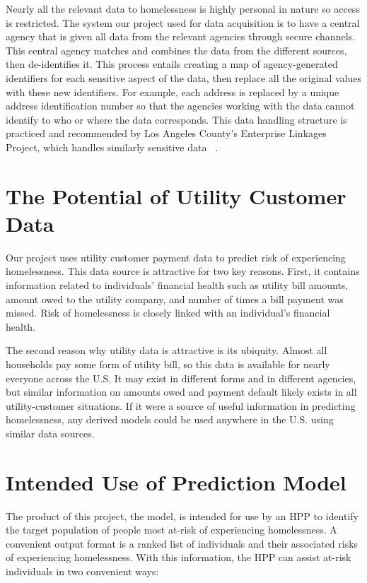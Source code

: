 \documentclass[10pt,letterpaper]{article}
\begin{document}
Nearly all the relevant data to homelessness is highly personal in nature so access is restricted. The system our project used for data acquisition is to have a central agency that is given all data from the relevant agencies through secure channels. This central agency matches and combines the data from the different sources, then de-identifies it. This process entails creating a map of agency-generated identifiers for each sensitive aspect of the data, then replace all the original values with these new identifiers. For example, each address is replaced by a unique address identification number so that the agencies working with the data cannot identify to who or where the data corresponds. This data handling structure is practiced and recommended by Los Angeles County's Enterprise Linkages Project, which handles similarly sensitive data ~\cite{byrne2012angeles}.

\section{The Potential of Utility Customer Data}
Our project uses utility customer payment data to predict risk of experiencing homelessness. This data source is attractive for two key reasons. First, it contains information related to individuals' financial health such as utility bill amounts, amount owed to the utility company, and number of times a bill payment was missed. Risk of homelessness is closely linked with an individual's financial health.

The second reason why utility data is attractive is its ubiquity. Almost all households pay some form of utility bill, so this data is available for nearly everyone across the U.S. It may exist in different forms and in different agencies, but similar information on amounts owed and payment default likely exists in all utility-customer situations. If it were a source of useful information in predicting homelessness, any derived models could be used anywhere in the U.S. using similar data sources. 

\section{Intended Use of Prediction Model}
The product of this project, the model, is intended for use by an HPP to identify the target population of people most at-risk of experiencing homelessness. A convenient output format is a ranked list of individuals and their associated risks of experiencing homelessness. With this information, the HPP can assist at-risk individuals in two convenient ways:
\end{document}
